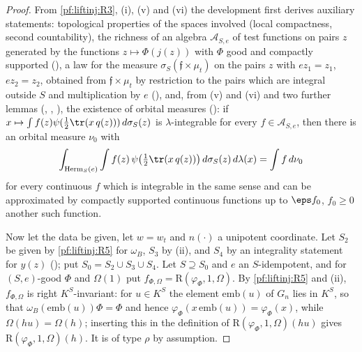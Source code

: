 \begin{proof}
From \ref{pf:liftinj:R3}, (i), (v) and (vi) the development first derives auxiliary statements: topological properties of the spaces involved (local compactness, second countability), the richness of an algebra $\mathcal A_{S,e}$ of test functions on pairs $z$ generated by the
functions $z\mapsto\Phi(j(z))$ with $\Phi$ good and compactly supported (), a law for the
measure $\sigma_S(\mathfrak f\times\mu_t)$ on the pairs $z$ with $ez_1=z_1$, $ez_2=z_2$, obtained from $\mathfrak f\times\mu_t$ by restriction to the pairs
which are integral outside $S$ and multiplication by $e$ (),
and, from (v) and (vi) and two further lemmas (,
, ), the existence of orbital
measures (): if $x\mapsto\int f(z)\psi(\frac12\tr(x\,q(z)))\,d\sigma_S(z)$ is $\lambda$-integrable for every
$f\in\mathcal A_{S,e}$, then there is an orbital measure $\nu_0$ with
\[
\int_{\mathrm{Herm}_S(e)}\int f(z)\,\psi\bigl(\tfrac12\tr(x\,q(z))\bigr)\,d\sigma_S(z)\,d\lambda(x)=\int f\,d\nu_0
\]
for every continuous $f$ which is integrable in the same sense and can be approximated by compactly supported continuous functions up to
$\eps f_0$, $f_0\ge0$ another such function.

Now let the data be given, let $w=w_t$ and $n(\cdot)$ a unipotent coordinate. Let $S_2$ be given by \ref{pf:liftinj:R5} for $\omega_B$, $S_3$ by (ii),
and $S_4$ by an integrality statement for $y(z)$ (); put
$S_0=S_2\cup S_3\cup S_4$. Let $S\supseteq S_0$ and $e$ an
$S$-idempotent, and for $(S,e)$-good $\Phi$ and $\Omega(1)$ put $f_{\Phi,\Omega}=\mathrm R(\varphi_\Phi,1,\Omega)$. By \ref{pf:liftinj:R5} and (ii),
$f_{\Phi,\Omega}$ is right $K^S$-invariant: for $u\in K^S$ the element $\mathrm{emb}(u)$ of $G_n$ lies in $K^S$, so that
$\omega_B(\mathrm{emb}(u))\Phi=\Phi$ and hence $\varphi_\Phi(x\,\mathrm{emb}(u))=\varphi_\Phi(x)$, while $\Omega(hu)=\Omega(h)$; inserting this in the definition of
$\mathrm R(\varphi_\Phi,1,\Omega)(hu)$ gives $\mathrm R(\varphi_\Phi,1,\Omega)(h)$. It is of type $\rho$ by assumption.


\end{proof}
